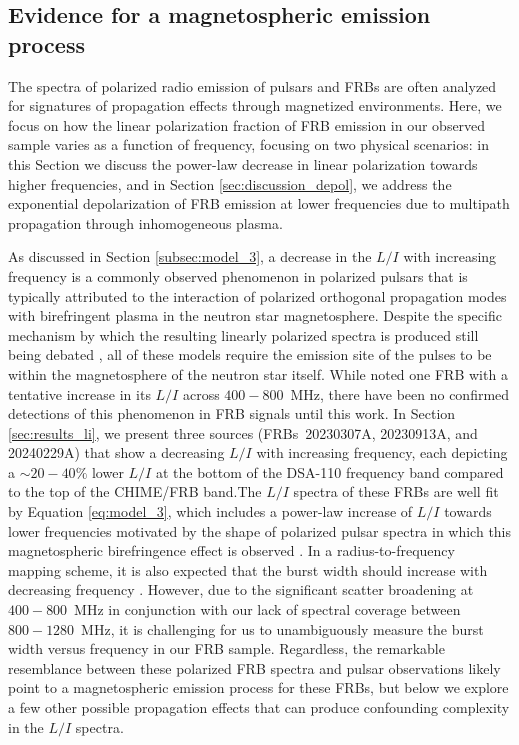 \documentclass[twocolumn, linenumbers]{aastex701}
\begin{document}
\subsection{Evidence for a magnetospheric emission process} \label{sec:discussion_emission}
The spectra of polarized radio emission of pulsars and FRBs are often analyzed for signatures of propagation effects through magnetized environments. Here, we focus on how the linear polarization fraction of FRB emission in our observed sample varies as a function of frequency, focusing on two physical scenarios: in this Section we discuss the power-law decrease in linear polarization towards higher frequencies, and in Section \ref{sec:discussion_depol}, we address the exponential depolarization of FRB emission at lower frequencies due to multipath propagation through inhomogeneous plasma.

As discussed in Section \ref{subsec:model_3}, a decrease in the $L/I$ with increasing frequency is a commonly observed phenomenon in polarized pulsars that is typically attributed to the interaction of polarized orthogonal propagation modes with birefringent plasma in the neutron star magnetosphere. Despite the specific mechanism by which the resulting linearly polarized spectra is produced still being debated \citep[e.g.,][]{1975ApJ...196...51R, 1986ApJ...302..138B, 1997ApJ...475..763M, 1998A&A...336..209V, 2005MNRAS.359..481K, 2008MNRAS.388..261J}, all of these models require the emission site of the pulses to be within the magnetosphere of the neutron star itself. While \cite{2024ApJ...968...50P} noted one FRB with a tentative increase in its $L/I$ across $400-800$~MHz, there have been no confirmed detections of this phenomenon in FRB signals until this work. In Section \ref{sec:results_li}, we present three sources (FRBs~20230307A, 20230913A, and 20240229A) that show a decreasing $L/I$ with increasing frequency, each depicting a $\sim 20-40\%$ lower $L/I$ at the bottom of the DSA-110 frequency band compared to the top of the CHIME/FRB band.The $L/I$ spectra of these FRBs are well fit by Equation \ref{eq:model_3}, which includes a power-law increase of $L/I$ towards lower frequencies motivated by the shape of polarized pulsar spectra in which this magnetospheric birefringence effect is observed \citep{1975ApJ...196...83M}. In a radius-to-frequency mapping scheme, it is also expected that the burst width should increase with decreasing frequency \citep[e.g.,][]{1997ApJ...475..763M}. However, due to the significant scatter broadening at $400-800$~MHz in conjunction with our lack of spectral coverage between $800-1280$~MHz, it is challenging for us to unambiguously measure the burst width versus frequency in our FRB sample. Regardless, the remarkable resemblance between these polarized FRB spectra and pulsar observations likely point to a magnetospheric emission process for these FRBs, but below we explore a few other possible propagation effects that can produce confounding complexity in the $L/I$ spectra.
\end{document}
